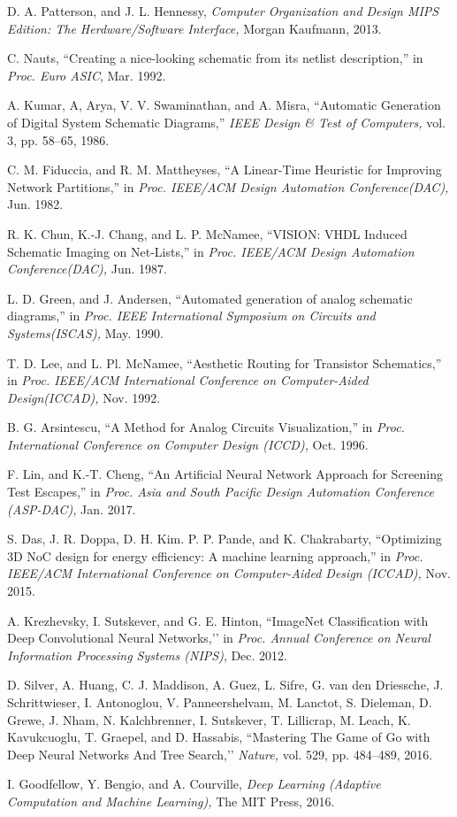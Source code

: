 \documentclass[twocolumn]{article}
\begin{document}
\begin{thebibliography}{99}
\footnotesize

D. A. Patterson, and J. L. Hennessy,
{\em Computer Organization and Design MIPS Edition:
 The Herdware/Software Interface,}
Morgan Kaufmann, 2013.

C. Nauts,
``Creating a nice-looking schematic from its netlist description,''
in {\em Proc. Euro ASIC}, Mar. 1992.

A. Kumar, A, Arya, V. V. Swaminathan, and A. Misra,
``Automatic Generation of Digital System Schematic Diagrams,''
{\em IEEE Design \& Test of Computers,}
vol. 3, pp. 58--65, 1986.

C. M. Fiduccia, and R. M. Mattheyses,
``A Linear-Time Heuristic for Improving Network Partitions,''
in {\em Proc. IEEE/ACM Design Automation Conference(DAC),}
Jun. 1982.

R. K. Chun, K.-J. Chang, and L. P. McNamee,
``VISION: VHDL Induced Schematic Imaging on Net-Lists,''
in {\em Proc. IEEE/ACM Design Automation Conference(DAC),}
Jun. 1987.

L. D. Green, and J. Andersen,
``Automated generation of analog schematic diagrams,''
in {\em Proc. IEEE International Symposium on Circuits and Systems(ISCAS),}
May. 1990.

T. D. Lee, and L. Pl. McNamee,
``Aesthetic Routing for Transistor Schematics,''
in {\em Proc. IEEE/ACM International Conference
 on Computer-Aided Design(ICCAD),}
Nov. 1992.

B. G. Arsintescu,
``A Method for Analog Circuits Visualization,''
in {\em Proc. International Conference on Computer Design (ICCD),}
Oct. 1996.

F. Lin, and K.-T. Cheng,
``An Artificial Neural Network Approach for Screening Test Escapes,''
in {\em Proc. Asia and South Pacific Design Automation Conference (ASP-DAC),}
Jan. 2017.

S. Das, J. R. Doppa, D. H. Kim. P. P. Pande, and K. Chakrabarty,
``Optimizing 3D NoC design for energy efficiency:
 A machine learning approach,''
in {\em Proc. IEEE/ACM International Conference on
 Computer-Aided Design (ICCAD),}
Nov. 2015.

A. Krezhevsky, I. Sutskever, and G. E. Hinton,
``ImageNet Classification with Deep Convolutional Neural Networks,’’
in {\em Proc. Annual Conference on Neural Information Processing Systems (NIPS)},
Dec. 2012.


D. Silver, A. Huang, C. J. Maddison, A. Guez, L. Sifre, G. van den Driessche,
J. Schrittwieser, I. Antonoglou, V. Panneershelvam, M. Lanctot, S. Dieleman,
D. Grewe, J. Nham, N. Kalchbrenner, I. Sutskever, T. Lillicrap, M. Leach,
K. Kavukcuoglu, T. Graepel, and D. Hassabis,
``Mastering The Game of Go with Deep Neural Networks And Tree Search,’’
{\em Nature,} vol. 529, pp. 484--489, 2016.

I. Goodfellow, Y. Bengio, and A. Courville,
{\em Deep Learning (Adaptive Computation and Machine Learning),}
The MIT Press, 2016. 

\end{thebibliography}
\end{document}
